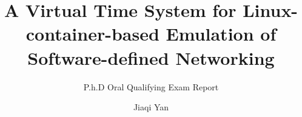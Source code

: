 \documentclass{sig-alternate-2013}
\begin{document}
\title{A Virtual Time System for Linux-container-based Emulation of Software-defined Networking}
\subtitle{P.h.D Oral Qualifying Exam Report}
%
%
%
%
%

%
\author{
%
%
\alignauthor
Jiaqi Yan\\
       \\
       \\
       \\
}
\end{document}
